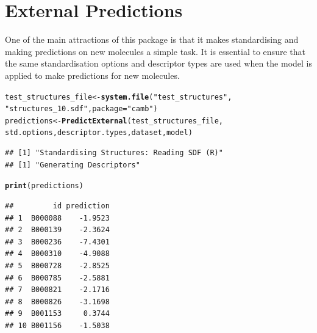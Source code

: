 \documentclass[twoside,a4wide,12pt]{article}\usepackage[]{graphicx}\usepackage[]{color}
\makeatletter
\newcommand{\hlstr}[1]{\textcolor[rgb]{0.192,0.494,0.8}{#1}}%
\newcommand{\hlstd}[1]{\textcolor[rgb]{0.345,0.345,0.345}{#1}}%
\newcommand{\hlkwb}[1]{\textcolor[rgb]{0.69,0.353,0.396}{#1}}%
\newcommand{\hlkwc}[1]{\textcolor[rgb]{0.333,0.667,0.333}{#1}}%
\newcommand{\hlkwd}[1]{\textcolor[rgb]{0.737,0.353,0.396}{\textbf{#1}}}%
\newenvironment{kframe}{%
 \def\at@end@of@kframe{}%
 \ifinner\ifhmode%
  \def\at@end@of@kframe{\end{minipage}}%
  \begin{minipage}{\columnwidth}%
 \fi\fi%
 \def\FrameCommand##1{\hskip\@totalleftmargin \hskip-\fboxsep
 \colorbox{shadecolor}{##1}\hskip-\fboxsep
     \hskip-\linewidth \hskip-\@totalleftmargin \hskip\columnwidth}%
 \MakeFramed {\advance\hsize-\width
   \@totalleftmargin\z@ \linewidth\hsize
   \@setminipage}}%
 {\par\unskip\endMakeFramed%
 \at@end@of@kframe}
\newenvironment{knitrout}{}{} %
\makeatother
\begin{document}
\section{External Predictions}

One of the main attractions of this package is that it makes standardising and making predictions on new molecules a simple task. It is essential to ensure that the same standardisation options and descriptor types are used when the model is applied to make predictions for new molecules.

\begin{knitrout}
\color{fgcolor}\begin{kframe}
\begin{alltt}
\hlstd{test_structures_file} \hlkwb{<-} \hlkwd{system.file}\hlstd{(}\hlstr{"test_structures"}\hlstd{,}
    \hlstr{"structures_10.sdf"}\hlstd{,} \hlkwc{package} \hlstd{=} \hlstr{"camb"}\hlstd{)}
\hlstd{predictions} \hlkwb{<-} \hlkwd{PredictExternal}\hlstd{(test_structures_file,}
    \hlstd{std.options, descriptor.types, dataset, model)}
\end{alltt}
\begin{verbatim}
## [1] "Standardising Structures: Reading SDF (R)"
## [1] "Generating Descriptors"
\end{verbatim}
\begin{alltt}
\hlkwd{print}\hlstd{(predictions)}
\end{alltt}
\begin{verbatim}
##         id prediction
## 1  B000088    -1.9523
## 2  B000139    -2.3624
## 3  B000236    -7.4301
## 4  B000310    -4.9088
## 5  B000728    -2.8525
## 6  B000785    -2.5881
## 7  B000821    -2.1716
## 8  B000826    -3.1698
## 9  B001153     0.3744
## 10 B001156    -1.5038
\end{verbatim}
\end{kframe}
\end{knitrout}

\printbibliography
\end{document}
